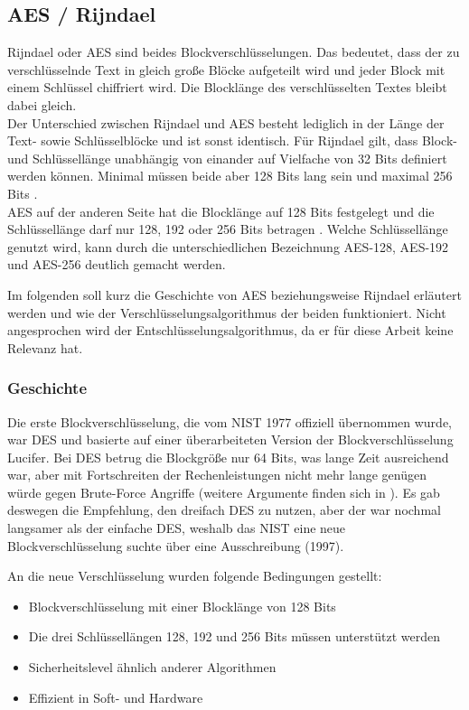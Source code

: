 \subsection[AES / Rijndael (Heumann \& Schenkel)]{AES / Rijndael}
\label{aes}
 Rijndael oder \ac{AES} sind beides Blockverschlüsselungen. Das bedeutet, dass der zu
 verschlüsselnde Text in gleich große Blöcke aufgeteilt wird und jeder Block mit einem Schlüssel
 chiffriert wird. Die Blocklänge des verschlüsselten Textes bleibt dabei gleich. \\
 Der Unterschied zwischen Rijndael und AES besteht lediglich in der Länge der Text- sowie
 Schlüsselblöcke und ist sonst identisch. Für Rijndael gilt, dass Block- und Schlüssellänge
 unabhängig von einander auf Vielfache von 32 Bits definiert werden können. Minimal müssen
 beide aber 128 Bits lang sein und maximal 256 Bits \cite{daemon02}. \\ %
 AES auf der anderen Seite hat die Blocklänge auf 128 Bits festgelegt und die Schlüssel\-länge
 darf nur 128, 192 oder 256 Bits betragen \cite{AES-FIPS}. Welche Schlüssel\-länge genutzt
 wird, kann durch die unterschiedlichen Bezeichnung AES-128, AES-192 und AES-256 deutlich gemacht
 werden.
 
 Im folgenden soll kurz die Geschichte von AES beziehungsweise Rijndael erläutert werden und
 wie der Verschlüsselungs\-algorithmus der beiden funktioniert. Nicht angesprochen wird der
 Entschlüsselungs\-algorithmus, da er für diese Arbeit keine Relevanz hat.
 
 \subsubsection[Geschichte (Heumann)]{Geschichte}
 \label{aes-geschichte}
 Die erste Blockverschlüsselung, die vom \ac{NIST} 1977 offiziell übernommen wurde, war
 \ac{DES} und basierte auf einer überarbeiteten Version der Blockverschlüsselung Lucifer. Bei
 DES betrug die Blockgröße nur 64 Bits, was lange Zeit ausreichend war, aber mit Fortschreiten
 der Rechenleistungen nicht mehr lange genügen würde gegen Brute-Force Angriffe (weitere
 Argumente finden sich in \cite{paar10}). Es gab deswegen die Empfehlung, den dreifach DES zu
 nutzen, aber der war nochmal langsamer als der einfache DES, weshalb das NIST eine neue
 Blockverschlüsselung suchte über eine Ausschreibung (1997).
 
 An die neue Verschlüsselung wurden folgende Bedingungen gestellt:
\begin{itemize}
 \item Blockverschlüsselung mit einer Blocklänge von 128 Bits
 \item Die drei Schlüssellängen 128, 192 und 256 Bits müssen unterstützt werden
 \item Sicherheitslevel ähnlich anderer Algorithmen
 \item Effizient in Soft- und Hardware
\end{itemize} 

